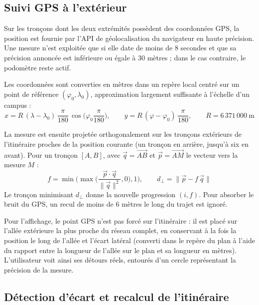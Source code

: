 \documentclass[12pt,a4paper]{report}
\begin{document}
\subsection{Suivi GPS à l'extérieur}

Sur les tronçons dont les deux extrémités possèdent des coordonnées GPS, la position est fournie
par l'API de géolocalisation du navigateur en haute précision. Une mesure n'est exploitée que si
elle date de moins de 8 secondes et que sa précision annoncée est inférieure ou égale à 30 mètres ;
dans le cas contraire, le podomètre reste actif.

Les coordonnées sont converties en mètres dans un repère local centré sur un point de référence
$(\varphi_0, \lambda_0)$, approximation largement suffisante à l'échelle d'un campus :
\begin{equation}
x = R\,(\lambda - \lambda_0)\,\frac{\pi}{180}\,\cos\!\Big(\varphi_0 \frac{\pi}{180}\Big),
\qquad
y = R\,(\varphi - \varphi_0)\,\frac{\pi}{180},
\qquad R = 6\,371\,000~\text{m}
\end{equation}

La mesure est ensuite projetée orthogonalement sur les tronçons extérieurs de l'itinéraire proches
de la position courante (un tronçon en arrière, jusqu'à six en avant). Pour un tronçon $[A, B]$,
avec $\vec{q} = \overrightarrow{AB}$ et $\vec{p} = \overrightarrow{AM}$ le vecteur vers la mesure
$M$ :
\begin{equation}
f = \min\!\Big(\max\!\Big(\frac{\vec{p}\cdot\vec{q}}{\|\vec{q}\|^2}, 0\Big), 1\Big),
\qquad
d_\perp = \big\|\vec{p} - f\,\vec{q}\big\|
\end{equation}
Le tronçon minimisant $d_\perp$ donne la nouvelle progression $(i, f)$. Pour absorber le bruit du
GPS, un recul de moins de 6 mètres le long du trajet est ignoré.

Pour l'affichage, le point GPS n'est pas forcé sur l'itinéraire : il est placé sur l'allée
extérieure la plus proche du réseau complet, en conservant à la fois la position le long de l'allée
et l'écart latéral (converti dans le repère du plan à l'aide du rapport entre la longueur de
l'allée sur le plan et sa longueur en mètres). L'utilisateur voit ainsi ses détours réels, entourés
d'un cercle représentant la précision de la mesure.

\subsection{Détection d'écart et recalcul de l'itinéraire}
\end{document}
